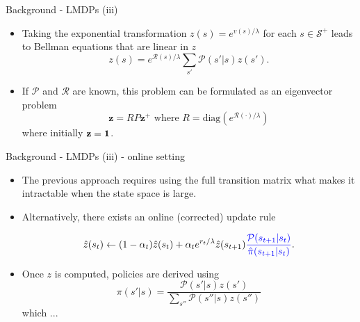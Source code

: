 \documentclass{beamer}
\theoremstyle{mystyle}
\newcommand{\cP}{\mathcal{P}}
\newcommand{\cR}{\mathcal{R}}
\newcommand{\cS}{\mathcal{S}}
\begin{document}
\begin{frame}{Background - LMDPs (iii)}
    
    \begin{itemize}
         \item Taking the exponential transformation $z(s)=e^{v(s)/\lambda}$ for each $s\in\cS^+$ leads to Bellman equations that are linear in $z$ \[ z(s) = e^{\cR(s)/\lambda} \sum_{s'}\cP(s'|s)z(s'). \]
         \item If $\cP$ and $\cR$ are known, this problem can be formulated as an eigenvector problem \[ \mathbf{z} = R P \mathbf{z^+} \text{  where  } R=\text{diag}(e^{\cR(\cdot)/\lambda}) \] where initially 
         $\mathbf z  = \bf 1$.
        \end{itemize}
\end{frame}

\begin{frame}{Background - LMDPs (iii) - online setting}

\begin{itemize}
\item The previous approach requires using the full transition matrix what makes it {\color{blue} intractable} when the state space is large.
\item Alternatively, there exists an online {\color{blue} (corrected)} update rule  
        
         \[ \hat{z}(s_t) \leftarrow (1-\alpha_t) \hat{z}(s_t) + \alpha_t e^{r_t/\lambda}\hat{z}(s_{t+1}) {\color{blue} \frac {\cP(s_{t+1}|s_t)} {\hat{\pi}(s_{t+1}|s_t)}}. \]
         
\item Once $z$ is computed, policies are derived using \[ \pi(s'|s) = \frac {\cP(s'|s)z(s')} {\sum_{s''} \cP(s''|s)z(s'')}\]
    which ...
\end{itemize}
\end{frame}
\end{document}
